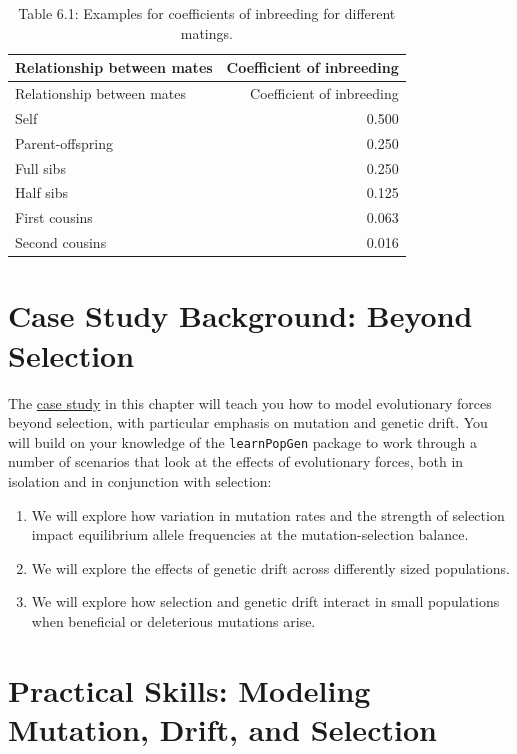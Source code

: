 \documentclass[
]{book}
\begin{document}
\begin{longtable}[]{@{}lr@{}}
\caption{Table 6.1: Examples for coefficients of inbreeding for different matings.}\tabularnewline
\toprule
Relationship between mates & Coefficient of inbreeding \\
\midrule
\endfirsthead
\toprule
Relationship between mates & Coefficient of inbreeding \\
\midrule
\endhead
Self & 0.500 \\
Parent-offspring & 0.250 \\
Full sibs & 0.250 \\
Half sibs & 0.125 \\
First cousins & 0.063 \\
Second cousins & 0.016 \\
\bottomrule
\end{longtable}

\hypertarget{case-study-background-beyond-selection}{%
\section{Case Study Background: Beyond Selection}\label{case-study-background-beyond-selection}}

The \href{exercises/BIOL520-ex5.zip}{case study} in this chapter will teach you how to model evolutionary forces beyond selection, with particular emphasis on mutation and genetic drift. You will build on your knowledge of the \texttt{learnPopGen} package to work through a number of scenarios that look at the effects of evolutionary forces, both in isolation and in conjunction with selection:

\begin{enumerate}
\def\labelenumi{\arabic{enumi}.}
\item
  We will explore how variation in mutation rates and the strength of selection impact equilibrium allele frequencies at the mutation-selection balance.
\item
  We will explore the effects of genetic drift across differently sized populations.
\item
  We will explore how selection and genetic drift interact in small populations when beneficial or deleterious mutations arise.
\end{enumerate}

\hypertarget{practical-skills-modeling-mutation-drift-and-selection}{%
\section{Practical Skills: Modeling Mutation, Drift, and Selection}\label{practical-skills-modeling-mutation-drift-and-selection}}
\end{document}
